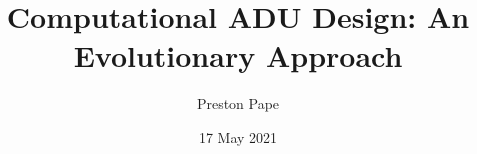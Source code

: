 \documentclass[10t]{report}
\begin{document}
\title{Computational ADU Design: 
An Evolutionary Approach}
\author{Preston Pape}
\date{17 May 2021}






\maketitle


\tableofcontents


%








\nocite{*} 
%
%
%
%
%
%
%
%
%

%
%

\end{document}
